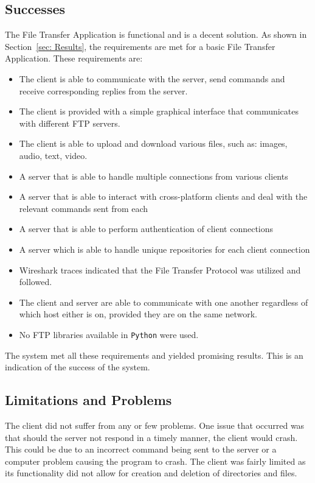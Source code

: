 \documentclass[10pt,twocolumn]{witseiepaper}
\def\code#1{\texttt{#1}}
\begin{document}
\subsection{Successes}
\label{sec: Successes}
The File Transfer Application is functional and is a decent solution. As shown in Section~\ref{sec: Results}, the requirements are met for a basic File Transfer Application. These requirements are:
\begin{itemize}
\item The client is able to communicate with the server, send commands and receive corresponding replies from the server.
\item The client is provided with a simple graphical interface that communicates with different FTP servers.
\item The client is able to upload and download various files, such as: images, audio, text, video.
\item A server that is able to handle multiple connections from various clients
\item A server that is able to interact with cross-platform clients and deal with the relevant commands sent from each
\item A server that is able to perform authentication of client connections
\item A server which is able to handle unique repositories for each client connection
\item Wireshark traces indicated that the File Transfer Protocol was utilized and followed.
\item The client and server are able to communicate with one another regardless of which host either is on, provided they are on the same network.
\item No FTP libraries available in \code{Python} were used.

\end{itemize}

The system met all these requirements and yielded promising results. This is an indication of the success of the system.


\subsection{Limitations and Problems}
\label{sec: Limitations and Problems}
The client did not suffer from any or few problems. One issue that occurred was that should the server not respond in a timely manner, the client would crash. This could be due to an incorrect command being sent to the server or a computer problem causing the program to crash. The client was fairly limited as its functionality did not allow for creation and deletion of directories and files. 
\end{document}
